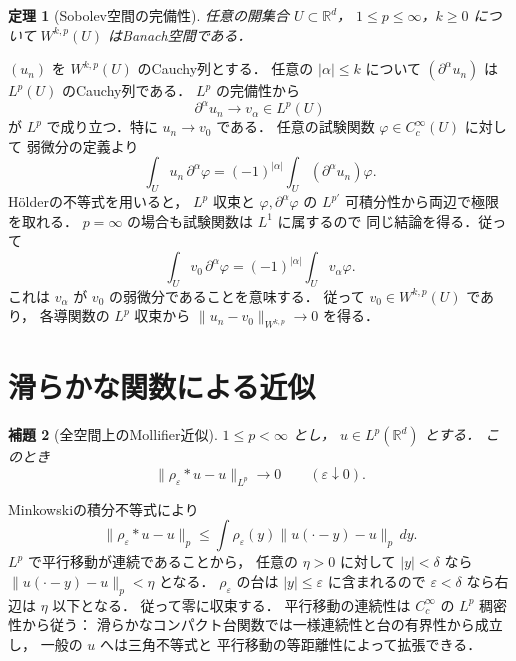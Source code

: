 \documentclass[a5paper,10pt,onecolumn]{jsarticle}
\makeatletter
\theoremstyle{mathnotetheorem}
\newtheorem{theorem}{定理}[section]
\newtheorem{lemma}[theorem]{補題}
\renewcommand{\proofname}{証明}
\renewenvironment{proof}[1][\proofname]{%
  \par\pushQED{\qed}\normalfont\topsep4\p@\@plus2\p@\relax
  \trivlist\item[\hskip\labelsep\bfseries #1]\ignorespaces
}{\popQED\endtrivlist\@endpefalse}
\newcommand{\norm}[1]{\lVert #1\rVert}
\makeatother
\begin{document}
\begin{theorem}[Sobolev空間の完備性]\label{thm:sobolev-banach}
任意の開集合 $U\subset\mathbb R^d$，
$1\le p\le\infty$，$k\ge0$ について
$W^{k,p}(U)$ はBanach空間である．
\end{theorem}
\begin{proof}
$(u_n)$ を $W^{k,p}(U)$ のCauchy列とする．
任意の $|\alpha|\le k$ について
$(\partial^\alpha u_n)$ は $L^p(U)$ のCauchy列である．
$L^p$ の完備性から
\[
 \partial^\alpha u_n\to v_\alpha\in L^p(U)
\]
が $L^p$ で成り立つ．特に $u_n\to v_0$ である．
任意の試験関数 $\varphi\in C_c^\infty(U)$ に対して
弱微分の定義より
\[
 \int_Uu_n\,\partial^\alpha\varphi
 =(-1)^{|\alpha|}\int_U(\partial^\alpha u_n)\varphi.
\]
H\"olderの不等式を用いると，
$L^p$ 収束と $\varphi,\partial^\alpha\varphi$ の
$L^{p'}$ 可積分性から両辺で極限を取れる．
$p=\infty$ の場合も試験関数は $L^1$ に属するので
同じ結論を得る．従って
\[
 \int_Uv_0\,\partial^\alpha\varphi
 =(-1)^{|\alpha|}\int_Uv_\alpha\varphi.
\]
これは $v_\alpha$ が $v_0$ の弱微分であることを意味する．
従って $v_0\in W^{k,p}(U)$ であり，
各導関数の $L^p$ 収束から
$\norm{u_n-v_0}_{W^{k,p}}\to0$ を得る．
\end{proof}

\section{滑らかな関数による近似}

\begin{lemma}[全空間上のMollifier近似]\label{lem:lp-mollifier}
$1\le p<\infty$ とし，
$u\in L^p(\mathbb R^d)$ とする．
このとき
\[
 \norm{\rho_\varepsilon*u-u}_{L^p}\to0
 \qquad(\varepsilon\downarrow0).
\]
\end{lemma}
\begin{proof}
Minkowskiの積分不等式により
\[
 \norm{\rho_\varepsilon*u-u}_p
 \le\int\rho_\varepsilon(y)
       \norm{u(\cdot-y)-u}_p\,dy.
\]
$L^p$ で平行移動が連続であることから，
任意の $\eta>0$ に対して
$|y|<\delta$ なら
$\norm{u(\cdot-y)-u}_p<\eta$ となる．
$\rho_\varepsilon$ の台は
$|y|\le\varepsilon$ に含まれるので
$\varepsilon<\delta$ なら右辺は $\eta$ 以下となる．
従って零に収束する．
平行移動の連続性は $C_c^\infty$ の
$L^p$ 稠密性から従う：
滑らかなコンパクト台関数では一様連続性と台の有界性から成立し，
一般の $u$ へは三角不等式と
平行移動の等距離性によって拡張できる．
\end{proof}
\end{document}
